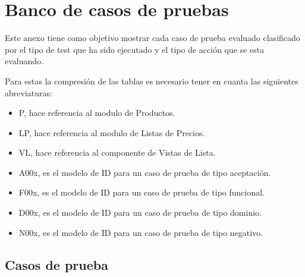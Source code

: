 \chapter{Banco de casos de pruebas}
Este anexo tiene como objetivo mostrar cada caso de prueba evaluado clasificado
por el tipo de test que ha sido ejecutado y el tipo de acción que se esta
evaluando.

Para estas la compresión de las tablas es necesario tener en cuanta las
siguientes abreviaturas:

\begin{itemize}
    \item P, hace referencia al modulo de Productos.
    \item LP, hace referencia al modulo de Listas de Precios.
    \item VL, hace referencia al componente de Vistas de Lista.
    \item A00x, es el modelo de ID para un caso de prueba de tipo aceptación.
    \item F00x, es el modelo de ID para un caso de prueba de tipo funcional.
    \item D00x, es el modelo de ID para un caso de prueba de tipo dominio.
    \item N00x, es el modelo de ID para un caso de prueba de tipo negativo.
\end{itemize}

\section{Casos de prueba}

